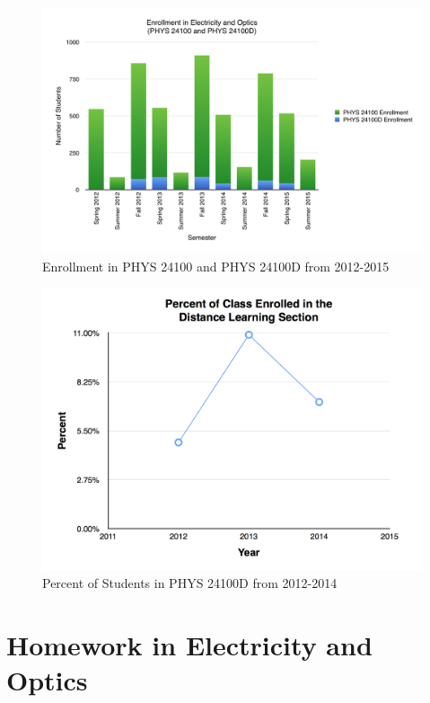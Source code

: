 \begin{figure}[h]
	\centering
	\includegraphics[width=5in]{img/chapter1/enrollment}
	\caption[Enrollment in PHYS 24100 and PHYS 24100D from 2012-2015]{Enrollment in PHYS 24100 and PHYS 24100D from 2012-2015}
	\label{fig:enrollment}
\end{figure}

\begin{figure}[h]
	\centering
	\includegraphics[width=5in]{img/chapter1/percent}
	\caption[Percent of Students in PHYS 24100D from 2012-2014]{Percent of Students in PHYS 24100D from 2012-2014}
	\label{fig:percent}
\end{figure}

\section{Homework in Electricity and Optics}

